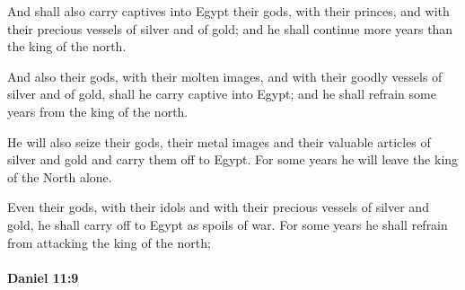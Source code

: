 			And shall also carry captives into Egypt their gods, with their princes, and with their precious vessels of silver and of gold; and he shall continue more years than the king of the north.

			\begin{versebox}
					\item[BHS] 
					\item[LXX] 
					\item[ASV] And also their gods, with their molten images, and with their goodly vessels of silver and of gold, shall he carry captive into Egypt; and he shall refrain some years from the king of the north.
					\item[NIV] He will also seize their gods, their metal images and their valuable articles of silver and gold and carry them off to Egypt. For some years he will leave the king of the North alone.
					\item[NRSV] Even their gods, with their idols and with their precious vessels of silver and gold, he shall carry off to Egypt as spoils of war. For some years he shall refrain from attacking the king of the north;
			\end{versebox}

		\paragraph{Daniel 11:9} %
			\label{DANIEL-11-9}

